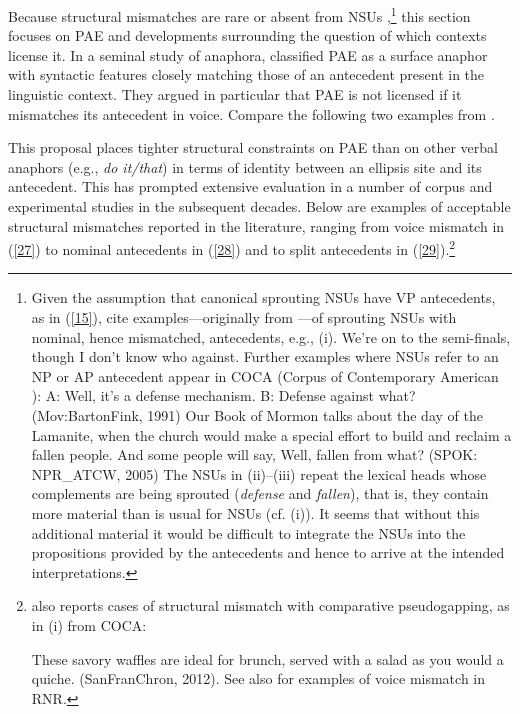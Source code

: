 Because structural mismatches are rare or absent from NSUs \citep[see][]{Merchant2005a, Merchant2013},\footnote{Given the assumption that canonical sprouting NSUs have VP antecedents, as in (\ref{15}), \citet[95]{Ginzburg2018} cite examples---originally from \citet[13]{Beecher2008}---of sprouting NSUs with nominal, hence mismatched, antecedents, e.g., (i).
	\ea We're on to the semi-finals, though I don't know who against.\z
%
	Further examples where NSUs refer to an NP or AP antecedent appear in COCA (Corpus of Contemporary American ):
%
	\ea  A: Well, it's a defense mechanism. B: Defense against what? (Mov:BartonFink, 1991)\z
	\ea Our Book of Mormon talks about the day of the Lamanite, when the church would make a special effort to build and reclaim a fallen people. And some people will say, Well, fallen from what? (SPOK: NPR\_ATCW, 2005)\z
%
	The NSUs in (ii)--(iii) repeat the lexical heads whose complements are being sprouted (\textit{defense} and \textit{fallen}), that is, they contain more material than is usual for NSUs (cf. (i)). It seems that without this additional material it would be difficult to integrate the NSUs into the propositions provided by the antecedents and hence to arrive at the intended interpretations.} this section focuses on PAE and developments surrounding the question of which contexts license it. In a seminal study of anaphora, \citet{Hankamer1976} classified PAE as a surface anaphor with syntactic features closely matching those of an antecedent present in the linguistic context. They argued in particular that PAE is not licensed if it mismatches its antecedent in voice. Compare the following two examples from \citet[327]{Hankamer1976}.

\eal
{}
\zl
This proposal places tighter structural constraints on PAE than on other verbal anaphors (e.g., \textit{do it/that}) in terms of identity between an ellipsis site and its antecedent. This has prompted extensive evaluation in a number of corpus and experimental studies in the subsequent decades. Below are examples of acceptable structural mismatches reported in the literature, ranging from voice mismatch in (\ref{27}) to nominal antecedents in (\ref{28}) and to split antecedents in (\ref{29}).\footnote{\citet[87]{Miller2014} also reports cases of structural mismatch with  comparative pseudogapping, as in (i) from COCA:

\ea These savory waffles are ideal for brunch, served with a salad as you would a quiche. (SanFranChron, 2012).\z
%
See also \citet{Abeille2016} for examples of voice mismatch in  RNR. 
}

